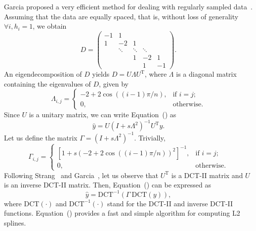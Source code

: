 \documentclass[preprint]{imsart}
\newcommand{\funct}[1]{\mathrm{#1}}
\newcommand{\transpose}[1]{#1^\mathrm{T}}
\begin{document}
Garcia proposed a very efficient method for dealing with regularly sampled data~\cite{garcia10}. Assuming that the data are equally spaced, that is, without loss of generality $\forall i, h_i = 1$, we obtain
\begin{equation}
D = 
\begin{pmatrix}
-1 & 1 \\
1 & -2 & 1 \\
& \ddots & \ddots & \ddots \\
&& 1 & -2 & 1 \\
&&& 1 & -1
\end{pmatrix} .
\end{equation}
An eigendecomposition of $D$ yields $D = U \varLambda \transpose{U}$, where $\varLambda$ is a diagonal matrix containing the eigenvalues of $D$, given by~\cite{yueh05}
\begin{equation}
    \varLambda_{i,j} =
    \begin{cases}
        -2 + 2 \cos((i-1) \pi / n) , & \text{if $i=j$;} \\
        0 , & \text{otherwise.}
    \end{cases}
\end{equation}
Since $U$ is a unitary matrix, we can write Equation~() as
\begin{equation}
     \hat{y} = U (I + s \varLambda^2)^{-1} \transpose{U} y .
     \label{eq:LSsolutionDecomposed}
\end{equation}
Let us define the matrix $\varGamma = (I + s \varLambda^2)^{-1}$. Trivially,
\begin{equation}
    \varGamma_{i, j} =
    \begin{cases}
     \left[ 1 + s (-2 + 2 \cos((i-1) \pi / n))^2 \right]^{-1} , & \text{if $i=j$;} \\
     0 , & \text{otherwise.}
     \end{cases}
     \label{eq:varGamma}
\end{equation}
Following Strang~\cite{strang99} and Garcia~\cite{garcia10}, let us observe that $\transpose{U}$ is a DCT-II matrix and $U$ is an inverse DCT-II matrix. Then, Equation~() can be expressed as
\begin{equation}
    \hat{y} = \funct{DCT^{-1}} (\varGamma \ \funct{DCT} (y)) ,
    \label{eq:LSsolutionDCT}
\end{equation}
where $\funct{DCT}(\cdot)$ and $\funct{DCT^{-1}}(\cdot)$ stand for the DCT-II and inverse DCT-II functions. Equation~() provides a fast and simple algorithm for computing L2 splines.
\end{document}
